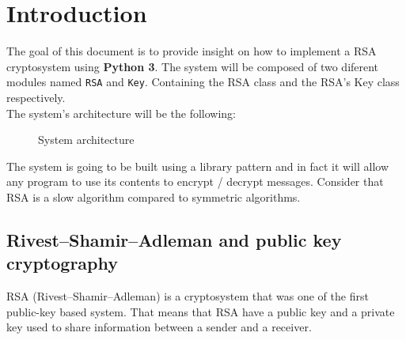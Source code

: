 \documentclass[usenames,dvipsnames,12pt]{report}
\begin{document}


\tableofcontents

\listoffigures

\chapter{Introduction}

The goal of this document is to provide insight on how to implement a RSA cryptosystem
using \textbf{Python 3}. The system will be composed of two diferent modules named
\texttt{RSA} and \texttt{Key}. Containing the RSA class and the RSA's Key class respectively.\\

The system's architecture will be the following:

\begin{figure}[H]
    \centering

    \caption{System architecture}
    \label{fig:system}
\end{figure}

The system is going to be built using a library pattern and in fact it will allow any program
to use its contents to encrypt / decrypt messages. Consider that RSA is a slow algorithm compared
to symmetric algorithms.

\section{Rivest–Shamir–Adleman and public key cryptography}

RSA (Rivest–Shamir–Adleman) is a cryptosystem that was one of the first public-key based system.
That means that RSA have a public key and a private key used to share information between a sender
and a receiver.
\end{document}
